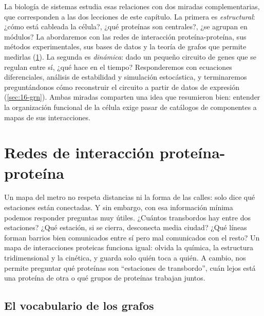 La biología de sistemas estudia esas relaciones con dos miradas complementarias, que corresponden a las dos lecciones de este capítulo. La primera es \emph{estructural}: ¿cómo está cableada la célula?, ¿qué proteínas son centrales?, ¿se agrupan en módulos? La abordaremos con las redes de interacción proteína-proteína, sus métodos experimentales, sus bases de datos y la teoría de grafos que permite medirlas (\cref{sec:16-ppi}). La segunda es \emph{dinámica}: dado un pequeño circuito de genes que se regulan entre sí, ¿qué hace en el tiempo? Responderemos con ecuaciones diferenciales, análisis de estabilidad y simulación estocástica, y terminaremos preguntándonos cómo reconstruir el circuito a partir de datos de expresión (\cref{sec:16-grn}). Ambas miradas comparten una idea que \textcite{c16-barabasi2004} resumieron bien: entender la organización funcional de la célula exige pasar de catálogos de componentes a mapas de sus interacciones.

\section{Redes de interacción proteína-proteína}\label{sec:16-ppi}

\begin{intuicion}
Un mapa del metro no respeta distancias ni la forma de las calles: solo dice qué estaciones están conectadas. Y sin embargo, con esa información mínima podemos responder preguntas muy útiles. ¿Cuántos transbordos hay entre dos estaciones? ¿Qué estación, si se cierra, desconecta media ciudad? ¿Qué líneas forman barrios bien comunicados entre sí pero mal comunicados con el resto? Un mapa de interacciones proteicas funciona igual: olvida la química, la estructura tridimensional y la cinética, y guarda solo quién toca a quién. A cambio, nos permite preguntar qué proteínas son ``estaciones de transbordo'', cuán lejos está una proteína de otra o qué grupos de proteínas trabajan juntos.
\end{intuicion}

\subsection{El vocabulario de los grafos}

